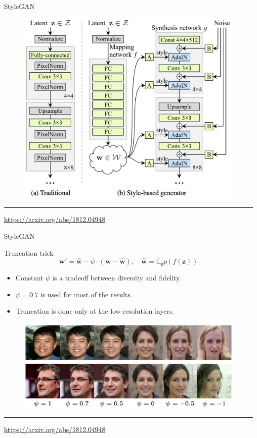 \documentclass{beamer}
\newcommand{\bw}{\mathbf{w}}
\newcommand{\bz}{\mathbf{z}}
\newcommand{\bbE}{\mathbb{E}}
\begin{document}
\begin{frame}{StyleGAN}
	\begin{figure}
		\centering
		\includegraphics[width=0.8\linewidth]{figs/stylegan_scheme}
	\end{figure}
	\vfill
	\hrule\medskip 
	{\scriptsize \href{https://arxiv.org/abs/1812.04948}{https://arxiv.org/abs/1812.04948}}
\end{frame}
\begin{frame}{StyleGAN}
	\begin{block}{Truncation trick}
		\vspace{-0.2cm}
		\[
			\bw' = \hat{\bw} - \psi \cdot (\bw - \hat{\bw}), \quad \hat{\bw} = \bbE_{\bz} p(f(\bz))
		\]
		\vspace{-0.2cm}
		\begin{itemize}
			\item Constant $\psi$ is a tradeoff between diversity and fidelity. 
			\item $\psi=0.7$ is used for most of the results.
			\item Truncation is done only at the low-resolution layers.
		\end{itemize}
		\begin{figure}
			\centering
			\includegraphics[width=0.8\linewidth]{figs/stylegan_truncation}
		\end{figure}
	\end{block}
	\vfill
	\hrule\medskip 
	{\scriptsize \href{https://arxiv.org/abs/1812.04948}{https://arxiv.org/abs/1812.04948}}
\end{frame}
\end{document}
